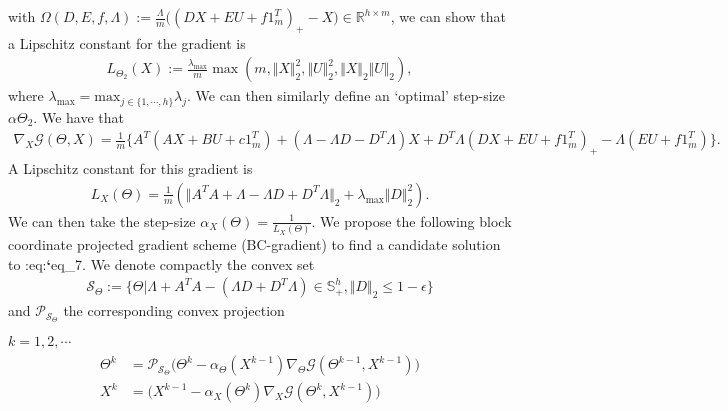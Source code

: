 \documentclass[letterpaper,10pt,english]{sphinxmanual}
\begin{document}
with \(\Omega(D,E,f,\Lambda) := \frac{\Lambda}{m}\bigg((DX + EU + f1_m^T)_+ - X \bigg) \in \mathbb{R}^{h \times m}\), we can show that a Lipschitz constant for the
gradient is
\begin{equation*}
\begin{split}L_{\Theta_2}(X) := \frac{\lambda_{\text{max}}}{m} \max(m,\Vert X \Vert_2^2,\Vert U \Vert_2^2,\Vert X \Vert_2 \Vert U \Vert_2),\end{split}
\end{equation*}
where \(\lambda_{\text{max}} = \text{max}_{j \in \{1,\cdots,h\}} \lambda_j\). We can then similarly define an ‘optimal’ step-size \(\alpha \Theta_2\).
We have that
\begin{equation*}
\begin{split}\nabla_X \mathcal{G}(\Theta,X) = \frac{1}{m} \bigg\{ A^T(AX + BU + c1_m^T) + (\Lambda - \Lambda D - D^T \Lambda)X + D^T \Lambda (DX + EU + f1_m^T)_+ - \Lambda(EU+f1_m^T) \bigg\}.\end{split}
\end{equation*}
A Lipschitz constant for this gradient is
\begin{equation*}
\begin{split}L_X(\Theta) = \frac{1}{m}(\Vert A^TA + \Lambda - \Lambda D + D^T\Lambda \Vert_2 + \lambda_{\text{max}} \Vert D \Vert_2^2).\end{split}
\end{equation*}
We can then take the step-size \(\alpha_X(\Theta) = \frac{1}{L_X(\Theta)}\). We propose the following block coordinate projected
gradient scheme (BC-gradient) to  find a candidate solution to :eq:{\color{red}\bfseries{}{}`}eq\_7. We denote compactly the convex set
\begin{equation*}
\begin{split}\mathcal{S}_{\Theta} := \{\Theta \vert \Lambda + A^TA - (\Lambda D + D^T \Lambda) \in \mathbb{S}_+^h, \Vert D \Vert_2 \leq 1 - \epsilon \}\end{split}
\end{equation*}
and \(\mathcal{P}_{\mathcal{S}_{\Theta}}\) the corresponding convex projection

 \(k = 1, 2, \cdots\) 
\begin{equation*}
\begin{split}\begin{align}
    \Theta^k &= \mathcal{P}_{\mathcal{S}_{\Theta}}\bigg(\Theta^k - \alpha_{\Theta}(X^{k-1}) \nabla_{\Theta} \mathcal{G}(\Theta^{k-1},X^{k-1}) \bigg) \\
    X^k &= \bigg(X^{k-1} - \alpha_X(\Theta^k) \nabla_X \mathcal{G}(\Theta^k,X^{k-1}) \bigg)
\end{align}\end{split}
\end{equation*}
\end{document}
